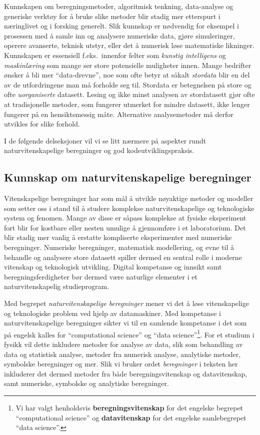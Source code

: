 \documentclass{article}
\begin{document}
Kunnskapen om beregningsmetoder, algoritmisk tenkning, data-analyse og generiske verktøy for å bruke slike metoder blir stadig mer etterspurt i næringlivet og i forsking generelt.
Slik kunnskap er nødvendig for eksempel i prosessen med å samle inn og analysere numeriske data, gjøre simuleringer, operere avanserte, teknisk utstyr, eller det å numerisk løse matematiske likninger.
Kunnskapen er essensiell f.eks.~innenfor felter som \emph{kunstig intelligens} og \emph{maskinlæring} som mange ser store potensielle muligheter innen.
Mange bedrifter ønsker å bli mer ``data-drevne'', noe som ofte betyr at såkalt \emph{stordata} blir en del av de utfordringene man må forholde seg til.
Stordata er betegnelsen på store og ofte \emph{uorganiserte} datasett.
Lesing og ikke minst analysen av stordatasett gjør ofte at tradisjonelle metoder, som fungerer utmerket for mindre datasett, ikke lenger fungerer på en hensiktsmessig måte.
Alternative analysemetoder må derfor utvikles for slike forhold.

I de følgende delseksjoner vil vi se litt nærmere på aspekter rundt naturvitenskapelige beregninger og god kodeutviklingspraksis.

\subsection{Kunnskap om naturvitenskapelige beregninger}
Vitenskapelige beregninger har som mål å utvikle nøyaktige metoder og modeller som setter oss i stand til å studere komplekse naturvitenskapelige og teknologiske system og fenomen. Mange av disse er såpass komplekse at fysiske eksperiment fort blir for kostbare eller nesten umulige å gjennomføre i et laboratorium. Det blir stadig mer vanlig å erstatte kompliserte eksperimenter med numeriske beregninger. Numeriske beregninger, matematisk modellering, og evne til å behandle og analysere store datasett spiller dermed en sentral rolle i moderne vitenskap og teknologisk utvikling. Digital kompetanse og innsikt samt beregningsferdigheter bør dermed være naturlige elementer i et naturvitenskapelig studieprogram.

Med begrepet \emph{naturvitenskapelige beregninger} mener vi det å løse vitenskapelige og teknologiske problem ved hjelp av datamaskiner.
Med kompetanse i naturvitenskapelige beregninger sikter vi til en samlende kompetanse i det som på engelsk kalles for ``computational science'' og ``data science''\footnote{Vi har valgt henholdsvis {\bf beregningsvitenskap} for det engelske begrepet ``computational science'' og {\bf datavitenskap} for det engelske samlebegrepet ``data science''.}. For et studium i fysikk vil dette inkludere metoder for analyse av data, slik som behandling av data og statistisk analyse, metoder fra numerisk analyse, analytiske metoder, symbolske beregninger og mer. Slik vi bruker ordet \emph{beregninger} i teksten her inkluderer det dermed metoder fra både beregningsvitenskap og datavitenskap, samt numeriske, symbolske og analytiske beregninger.
\end{document}
